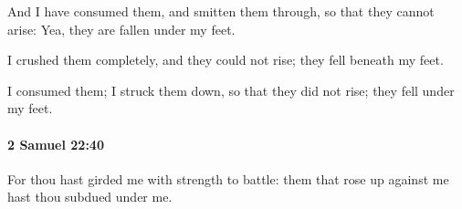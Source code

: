 			\begin{versebox}
					\item[BHS] 
					\item[ASV] And I have consumed them, and smitten them through, so that they cannot arise: Yea, they are fallen under my feet.
					\item[NIV] I crushed them completely, and they could not rise; they fell beneath my feet.
					\item[NRSV] I consumed them; I struck them down, so that they did not rise; they fell under my feet.
			\end{versebox}

		\paragraph{2 Samuel 22:40} %
			\label{2SAMUEL-22-40}

			For thou hast girded me with strength to battle: them that rose up against me hast thou subdued under me.

